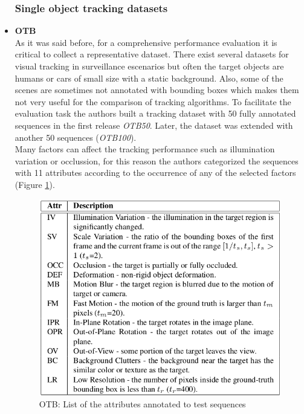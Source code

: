 \begin{itemize}
\subsubsection{Single object tracking datasets}
\item \textbf{OTB} ~\cite{wu2013online}\\
As it was said before, for a comprehensive performance evaluation it is critical to collect a representative dataset. There exist several datasets for visual tracking in surveillance escenarios but often the target objects are humans or cars of small size with a static background. Also, some of the scenes are sometimes not annotated with bounding boxes which makes them not very useful for the comparison of tracking algorithms. To facilitate the evaluation task the authors built a tracking dataset with 50 fully annotated sequences in the first release \textit{OTB50}. Later, the dataset was extended with another 50 sequences (\textit{OTB100}).\\ Many factors can affect the tracking performance such as illumination variation or occlussion, for this reason the authors categorized the sequences with 11 attributes according to the occurrence of any of the selected factors (Figure \ref{fig:otb}).\\
\begin{figure}[H]
\begin{center}
\includegraphics[scale=0.3]{previous_version/otb_attributes.png}
\caption{OTB: List of the attributes annotated to test sequences ~\cite{wu2013online}}
\label{fig:otb}
\end{center}

\end{figure}
\end{itemize}
